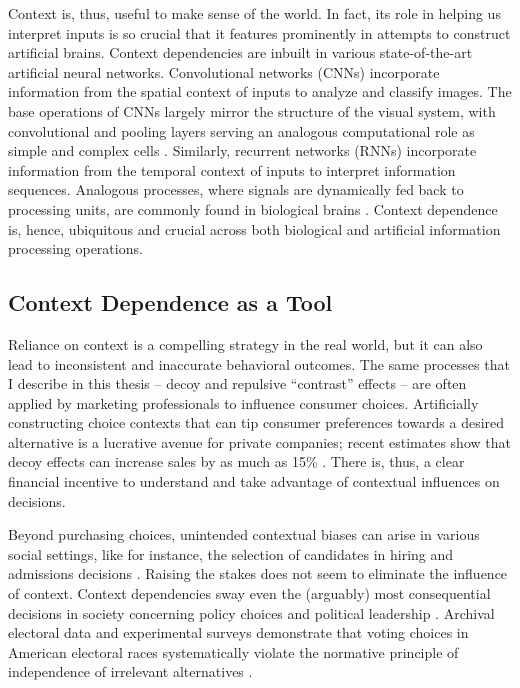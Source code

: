 \documentclass[a4paper, nobind]{templates/ociamthesis}
\begin{document}
Context is, thus, useful to make sense of the world. In fact, its role in helping us interpret inputs is so crucial that it features prominently in attempts to construct artificial brains. Context dependencies are inbuilt in various state-of-the-art artificial neural networks. Convolutional networks (CNNs) incorporate information from the spatial context of inputs to analyze and classify images. The base operations of CNNs largely mirror the structure of the visual system, with convolutional and pooling layers serving an analogous computational role as simple and complex cells \autocite{lindsay2021}. Similarly, recurrent networks (RNNs) incorporate information from the temporal context of inputs to interpret information sequences. Analogous processes, where signals are dynamically fed back to processing units, are commonly found in biological brains \autocite{goulas2021}. Context dependence is, hence, ubiquitous and crucial across both biological and artificial information processing operations.

\hypertarget{context-dependence-as-a-tool}{%
\subsection{Context Dependence as a Tool}\label{context-dependence-as-a-tool}}

Reliance on context is a compelling strategy in the real world, but it can also lead to inconsistent and inaccurate behavioral outcomes. The same processes that I describe in this thesis -- decoy \autocite{wu2020} and repulsive ``contrast'' effects \autocite{levin2002} -- are often applied by marketing professionals to influence consumer choices. Artificially constructing choice contexts that can tip consumer preferences towards a desired alternative is a lucrative avenue for private companies; recent estimates show that decoy effects can increase sales by as much as 15\% \autocite{wu2020}. There is, thus, a clear financial incentive to understand and take advantage of contextual influences on decisions.

Beyond purchasing choices, unintended contextual biases can arise in various social settings, like for instance, the selection of candidates in hiring and admissions decisions \autocite{highhouse1996,norton2004,simonsohn2013}. Raising the stakes does not seem to eliminate the influence of context. Context dependencies sway even the (arguably) most consequential decisions in society concerning policy choices \autocite{herne1997} and political leadership \autocite{chang2019}. Archival electoral data and experimental surveys demonstrate that voting choices in American electoral races systematically violate the normative principle of independence of irrelevant alternatives \autocite{sueocurry1995,chang2019}.
\end{document}
